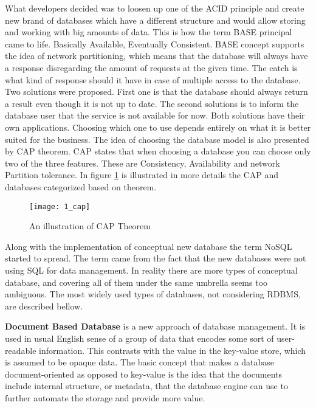 What developers decided was to loosen up one of the ACID principle and create new brand of databases which have a different structure and would allow storing and working with big amounts of data. This is how the term BASE principal came to life. Basically Available, Eventually Consistent. BASE concept supports the idea of network partitioning, which means that the database will always have a response disregarding the amount of requests at the given time. The catch is what kind of response should it have in case of multiple access to the database. Two solutions were proposed. First one is that the database should always return a result even though it is not up to date. The second solutions is to inform the database user that the service is not available for now. Both solutions have their own applications. Choosing which one to use depends entirely on what it is better suited for the business. The idea of choosing the database model is also presented by CAP theorem. CAP states that when choosing a database you can choose only two of the three features. These are Consistency, Availability and network Partition tolerance. In figure \mbox{\ref{cap}} is illustrated in more details the CAP and databases categorized based on theorem.

\begin{figure}[!ht]
\centering
\texttt{[image: 1\_cap]}
\caption{An illustration of CAP Theorem}\label{cap}
\end{figure}

Along with the implementation of conceptual new database the term NoSQL started to spread. The term came from the fact that the new databases were not using SQL for data management. In reality there are more types of conceptual database, and covering all of them under the same umbrella seems too ambiguous.
The most widely used types of databases, not considering RDBMS, are described bellow.

\textbf{Document Based Database} is a new approach of database management. It is used in usual English sense of a group of data that encodes some sort of user-readable information. This contrasts with the value in the key-value store, which is assumed to be opaque data. The basic concept that makes a database document-oriented as opposed to key-value is the idea that the documents include internal structure, or metadata, that the database engine can use to further automate the storage and provide more value.

